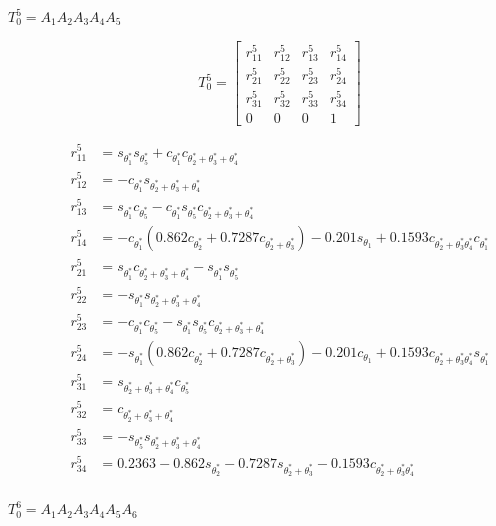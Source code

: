 \documentclass[journal]{new-aiaa}
\begin{document}
\begin{description}
    \item[$T_0^5=A_1A_2A_3A_4A_5$] \hfill

    $$
    T_0^5 = \begin{bmatrix}
        r_{11}^5 & r_{12}^5 & r_{13}^5 & r_{14}^5 \\
        r_{21}^5 & r_{22}^5 & r_{23}^5 & r_{24}^5 \\
        r_{31}^5 & r_{32}^5 & r_{33}^5 & r_{34}^5 \\
        0 & 0 & 0 & 1
    \end{bmatrix}
    $$

    \begin{align*}
        r_{11}^5 &= s_{\theta_1^*}s_{\theta_5^*} + c_{\theta_1^*}c_{\theta_2^*+\theta_3^*+\theta_4^*} \\
        r_{12}^5 &= -c_{\theta_1^*}s_{\theta_2^*+\theta_3^*+\theta_4^*} \\
        r_{13}^5 &= s_{\theta_1^*}c_{\theta_5^*}-c_{\theta_1^*}s_{\theta_5^*}c_{\theta_2^*+\theta_3^*+\theta_4^*} \\
        r_{14}^5 &= -c_{\theta_1^*}(0.862c_{\theta_2^*}+0.7287c_{\theta_2^*+\theta_3^*})-0.201s_{\theta_1} + 0.1593 c_{\theta_2^*+\theta_3^*\theta_4^*} c_{\theta_1^*} \\
        r_{21}^5 &= s_{\theta_1^*}c_{\theta_2^*+\theta_3^*+\theta_4^*}-s_{\theta_1^*}s_{\theta_5^*} \\
        r_{22}^5 &= -s_{\theta_1^*}s_{\theta_2^*+\theta_3^*+\theta_4^*} \\
        r_{23}^5 &= -c_{\theta_1^*}c_{\theta_5^*}-s_{\theta_1^*}s_{\theta_5^*}c_{\theta_2^*+\theta_3^*+\theta_4^*}\\
        r_{24}^ 5&= -s_{\theta_1^*}(0.862c_{\theta_2^*}+0.7287c_{\theta_2^*+\theta_3^*})-0.201c_{\theta_1} + 0.1593 c_{\theta_2^*+\theta_3^*\theta_4^*} s_{\theta_1^*}\\
        r_{31}^5 &= s_{\theta_2^*+\theta_3^*+\theta_4^*}c_{\theta_5^*} \\
        r_{32}^5 &= c_{\theta_2^*+\theta_3^*+\theta_4^*} \\
        r_{33}^5 &= -s_{\theta_5^*}s_{\theta_2^*+\theta_3^*+\theta_4^*} \\
        r_{34}^{5}&= 0.2363-0.862 s_{\theta_2^*} -0.7287 s_{\theta_2^*+\theta_3^*} - 0.1593 c_{\theta_2^*+\theta_3^*\theta_4^*} \\
    \end{align*}

    \item[$T_0^6=A_1A_2A_3A_4A_5A_6$] \hfill


\end{description}
\end{document}

